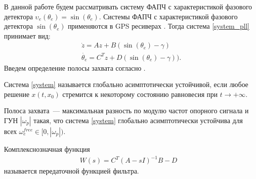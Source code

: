 \documentclass[a4paper,article,14pt]{extarticle}
\begin{document}
В данной работе будем рассматривать систему ФАПЧ с характеристикой фазового детектора $\upsilon_e(\theta_e) = \operatorname{sin}(\theta_e)$. Системы ФАПЧ с характеристикой фазового детектора $\operatorname{sin}(\theta_e)$ применяются в GPS ресиверах \cite{kaplan}. Тогда система \eqref{system_pll} принимает вид:
 \begin{equation}\label{system}
 \begin{aligned}
 &\dot{z} = Az + B(\operatorname{sin}(\theta_e) - \gamma)\\
 &\dot{\theta_e} = C^Tz + D(\operatorname{sin}(\theta_e) - \gamma)).
 \end{aligned}
\end{equation}
Введем определение полосы захвата согласно \cite{kuznetsov_article}.
\begin{definition}
Система \eqref{system} называется глобально асимптотически устойчивой, если любое решение $x(t, x_0)$  стремится к некоторому состоянию равновесия при $t \rightarrow +\infty$.
\end{definition}

\begin{definition}
Полоса захвата~--- максимальная разность по модулю частот опорного сигнала и ГУН $|\omega_p|$ такая, что система \eqref{system} глобально асимптотически устойчива для всех $\omega_e^{free} \in [0, |\omega_p|)$.
\end{definition}

\begin{definition}
Комплекснозначная функция  
\begin{equation}
 \begin{aligned}
 W(s)=C^T \left(A-sI\right)^{-1}B - D
 \end{aligned}
\end{equation}
называется передаточной функцией фильтра.
\end{definition}
\end{document}
